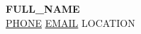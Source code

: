 \documentclass[10pt, letterpaper]{article}
\let\hrefWithoutArrow\href
\begin{document}
\noindent
\colorbox{lightbg}{%
  \begin{minipage}{\dimexpr\textwidth-2\fboxsep\relax}
    \vspace{6pt}
    \begin{center}
      {\LARGE\bfseries\color{accent} {{FULL_NAME}}}\\[3pt]
      \small\color{darktext}
        \hrefWithoutArrow{tel:{{PHONE_RAW}}}{{{PHONE}}}\enspace\textbar\enspace
        \hrefWithoutArrow{mailto:{{EMAIL}}}{{{EMAIL}}}\enspace\textbar\enspace
        {{LOCATION}}
    \end{center}
    \vspace{5pt}
  \end{minipage}%
}

\vspace{10pt}
\end{document}
